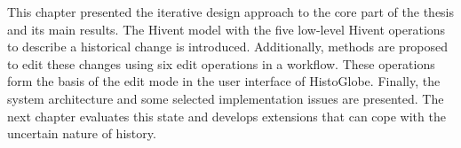 

\vspace{2em}

This chapter presented the iterative design approach to the core part of the thesis and its main results. The Hivent model with the five low-level Hivent operations to describe a historical change is introduced. Additionally, methods are proposed to edit these changes using six edit operations in a workflow.
These operations form the basis of the edit mode in the user interface of HistoGlobe. Finally, the system architecture and some selected implementation issues are presented. The next chapter evaluates this state and develops extensions that can cope with the uncertain nature of history.
